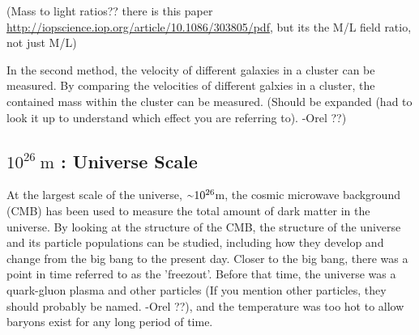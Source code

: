     {\color{red}(Mass to light ratios?? there is this paper \url{http://iopscience.iop.org/article/10.1086/303805/pdf}, but its the M/L field ratio, not just M/L)}

    In the second method, the velocity of different galaxies in a cluster can be measured.
    By comparing the velocities of different galxies in a cluster, the contained mass within the cluster can be measured.
    {\color{red}(Should be expanded (had to look it up to understand which effect you are referring to). -Orel ??)}

  \subsection{$10^{26}\:\text{m}$ : Universe Scale}
    At the largest scale of the universe, $\nicetilde 10^{26}$m, the cosmic microwave background (CMB) has been used to measure the total amount of dark matter in the universe.
    By looking at the structure of the CMB, the structure of the universe and its particle populations can be studied, including how they develop and change from the big bang to the present day.
    Closer to the big bang, there was a point in time referred to as the 'freezout'.
    Before that time, the universe was a quark-gluon plasma {\color{red}and other particles (If you mention other particles, they should probably be named. -Orel ??)}, and the temperature was too hot to allow baryons exist for any long period of time.

